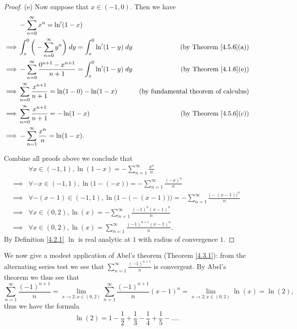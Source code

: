 \begin{proof}{(e)}
    Now suppose that \(x \in (-1, 0)\).
    Then we have
    \begin{align*}
                 & - \sum_{n = 0}^\infty x^n = \ln'(1 - x)                                                                                              \\
        \implies & \int_x^0 \bigg(- \sum_{n = 0}^\infty y^n\bigg) \; dy = \int_x^0 \ln'(1 - y) \; dy      & \text{(by Theorem \ref{4.5.6}(a))}          \\
        \implies & - \sum_{n = 0}^\infty \frac{0^{n + 1} - x^{n + 1}}{n + 1} = \int_x^0 \ln'(1 - y) \; dy & \text{(by Theorem \ref{4.1.6}(e))}          \\
        \implies & \sum_{n = 0}^\infty \frac{x^{n + 1}}{n + 1} = \ln(1 - 0) - \ln(1 - x)                  & \text{(by fundamental theorem of calculus)} \\
        \implies & \sum_{n = 0}^\infty \frac{x^{n + 1}}{n + 1} = -\ln(1 - x)                              & \text{(by Theorem \ref{4.5.6}(c))}          \\
        \implies & - \sum_{n = 1}^\infty \frac{x^n}{n} = \ln(1 - x).
    \end{align*}

    Combine all proofs above we conclude that
    \begin{align*}
                 & \forall x \in (-1, 1), \ln(1 - x) = - \sum_{n = 1}^\infty \frac{x^n}{n}                                                  \\
        \implies & \forall -x \in (-1, 1), \ln\big(1 - (-x)\big) = - \sum_{n = 1}^\infty \frac{(-x)^n}{n}                                   \\
        \implies & \forall -(x - 1) \in (-1, 1), \ln\Big(1 - \big(-(x - 1)\big)\Big) = - \sum_{n = 1}^\infty \frac{\big(-(x - 1)\big)^n}{n} \\
        \implies & \forall x \in (0, 2), \ln(x) = - \sum_{n = 1}^\infty \frac{(-1)^n (x - 1)^n}{n}                                          \\
        \implies & \forall x \in (0, 2), \ln(x) = \sum_{n = 1}^\infty \frac{(-1)^{n + 1} (x - 1)^n}{n}.
    \end{align*}
    By Definition \ref{4.2.1} \(\ln\) is real analytic at \(1\) with radius of convergence \(1\).
\end{proof}

\begin{example}\label{4.5.7}
    We now give a modest application of Abel's theorem (Theorem \ref{4.3.1}):
    from the alternating series test we see that \(\sum_{n = 1}^\infty \frac{(-1)^{n + 1}}{n}\) is convergent.
    By Abel's theorem we thus see that
    \[
        \sum_{n = 1}^\infty \frac{(-1)^{n + 1}}{n} = \lim_{x \to 2 ; x \in (0, 2)} \sum_{n = 1}^\infty \frac{(-1)^{n + 1}}{n} (x - 1)^n = \lim_{x \to 2 ; x \in (0, 2)} \ln(x) = \ln(2),
    \]
    thus we have the formula
    \[
        \ln(2) = 1 - \frac{1}{2} + \frac{1}{3} - \frac{1}{4} +\frac{1}{5} - \dots.
    \]
\end{example}

